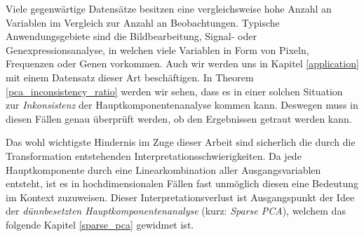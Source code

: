 Viele gegenwärtige Datensätze besitzen eine vergleichsweise hohe Anzahl an Variablen im Vergleich zur Anzahl an Beobachtungen. Typische Anwendungsgebiete sind die Bildbearbeitung, Signal- oder  Genexpressionsanalyse, in welchen viele Variablen in Form von Pixeln, Frequenzen oder Genen vorkommen. Auch wir werden uns in Kapitel \ref{application} mit einem Datensatz dieser Art beschäftigen. In Theorem \ref{pca_inconsistency_ratio} werden wir sehen, dass es in einer solchen Situation zur \textit{Inkonsistenz} der Hauptkomponentenanalyse kommen kann. Deswegen muss in diesen Fällen genau überprüft werden, ob den Ergebnissen getraut werden kann.

Das wohl wichtigste Hindernis im Zuge dieser Arbeit sind sicherlich die durch die Transformation entstehenden Interpretationsschwierigkeiten. Da jede Hauptkomponente durch eine Linearkombination aller Ausgangsvariablen entsteht, ist es in hochdimensionalen Fällen fast unmöglich diesen eine Bedeutung im Kontext zuzuweisen. Dieser Interpretationsverlust ist Ausgangspunkt der Idee der \textit{dünnbesetzten Hauptkomponentenanalyse} (kurz: \textit{Sparse PCA}), welchem das folgende Kapitel \ref{sparse_pca} gewidmet ist.




